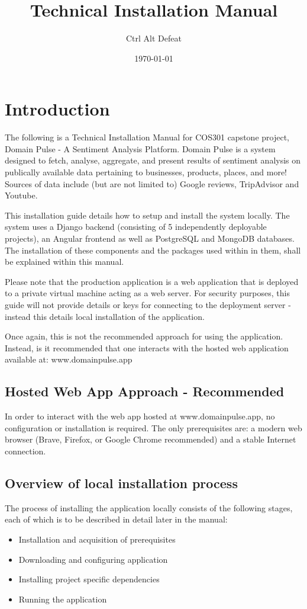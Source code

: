 \documentclass{article}
\title{Technical Installation Manual}
\author{Ctrl Alt Defeat}
\date{\today}
\begin{document}
\maketitle

\tableofcontents


\section{Introduction}
The following is a Technical Installation Manual for COS301 capstone project, Domain Pulse - A Sentiment Analysis Platform. Domain Pulse is
a system designed to fetch, analyse, aggregate, and present results of sentiment analysis on publically available data pertaining to
businesses, products, places, and more! Sources of data include (but are not limited to) Google reviews, TripAdvisor and Youtube.

This installation guide details how to setup and install the system locally. The system uses a Django backend (consisting of 5 independently deployable projects),
an Angular frontend as well as PostgreSQL and MongoDB databases. The installation of these components and the packages used within in
them, shall be explained within this manual.

Please note that the production application is a web application that is deployed to a private virtual machine acting as a web server. For
security purposes, this guide will not provide details or keys for connecting to the deployment server - instead this details local installation
of the application.

Once again, this is not the recommended approach for using the application. Instead, is it recommended that one interacts with the hosted web
application available at: www.domainpulse.app

\subsection{Hosted Web App Approach - Recommended}
In order to interact with the web app hosted at www.domainpulse.app, no configuration or installation is required. The only
prerequisites are: a modern web browser (Brave, Firefox, or Google Chrome recommended) and a stable Internet connection.


\subsection{Overview of local installation process}
The process of installing the application locally consists of the following stages, each of which is to be described in detail later in the manual:
\begin{itemize}
    \item Installation and acquisition of prerequisites
    \item Downloading and configuring application
    \item Installing project specific dependencies
    \item Running the application
\end{itemize}
\end{document}
